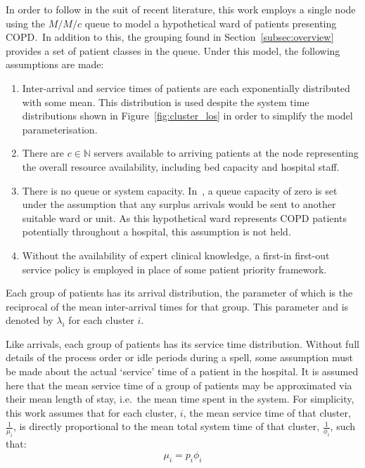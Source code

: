 \documentclass[11pt]{article}
\begin{document}
In order to follow in the suit of recent literature, this work employs a single
node using the \(M/M/c\) queue to model a hypothetical ward of patients
presenting COPD.\ In addition to this, the grouping found in
Section~\ref{subsec:overview} provides a set of patient classes in the queue.
Under this model, the following assumptions are made:
\begin{enumerate}
    \item Inter-arrival and service times of patients are each exponentially
        distributed with some mean. This distribution is used despite the system
        time distributions shown in Figure~\ref{fig:cluster_los} in order to
        simplify the model parameterisation.
    \item There are \(c \in \mathbb{N}\) servers available to arriving patients
        at the node representing the overall resource availability, including
        bed capacity and hospital staff.
    \item There is no queue or system capacity. In~\cite{Williams2015}, a
        queue capacity of zero is set under the assumption that any surplus
        arrivals would be sent to another suitable ward or unit. As this
        hypothetical ward represents COPD patients potentially throughout a
        hospital, this assumption is not held.
    \item Without the availability of expert clinical knowledge, a first-in
        first-out service policy is employed in place of some patient priority 
        framework.
\end{enumerate}

Each group of patients has its arrival distribution, the parameter of which is
the reciprocal of the mean inter-arrival times for that group. This parameter
and is denoted by \(\lambda_i\) for each cluster \(i\).

Like arrivals, each group of patients has its service time distribution.
Without full details of the process order or idle periods during a spell, some
assumption must be made about the actual `service' time of a patient in the
hospital. It is assumed here that the mean service time of a group of patients
may be approximated via their mean length of stay, i.e.\ the mean time spent in
the system. For simplicity, this work assumes that for each cluster, \(i\), the
mean service time of that cluster, \(\frac{1}{\mu_i}\), is directly proportional
to the mean total system time of that cluster, \(\frac{1}{\phi_i}\), such that:
\begin{equation}\label{eq:services}
    \mu_i = p_i \phi_i
\end{equation}
\end{document}
